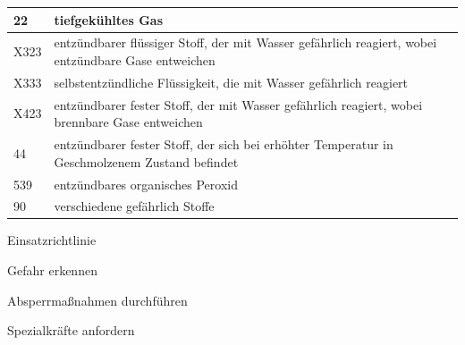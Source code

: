 \documentclass{article}
\begin{document}
\begin{flushleft}
\begin{tabular}{|m{0.97999996cm}m{12.317cm}|}
\hline
22

 &
tiefgek\"uhltes Gas

\\\hline
X323

 &
entz\"undbarer fl\"ussiger Stoff, der mit Wasser gef\"ahrlich reagiert,
wobei entz\"undbare Gase entweichen

\\\hline
X333

 &
selbstentz\"undliche Fl\"ussigkeit, die mit Wasser gef\"ahrlich reagiert

\\\hline
X423

 &
entz\"undbarer fester Stoff, der mit Wasser gef\"ahrlich reagiert, wobei
brennbare Gase entweichen

\\\hline
44

 &
entz\"undbarer fester Stoff, der sich bei erh\"ohter Temperatur in
Geschmolzenem Zustand befindet

\\\hline
539

 &
entz\"undbares organisches Peroxid

\\\hline
90

 &
verschiedene gef\"ahrlich Stoffe

\\\hline
\end{tabular}
\end{flushleft}
Einsatzrichtlinie

Gefahr erkennen

Absperrma{\ss}nahmen durchf\"uhren

Spezialkr\"afte anfordern
\end{document}
